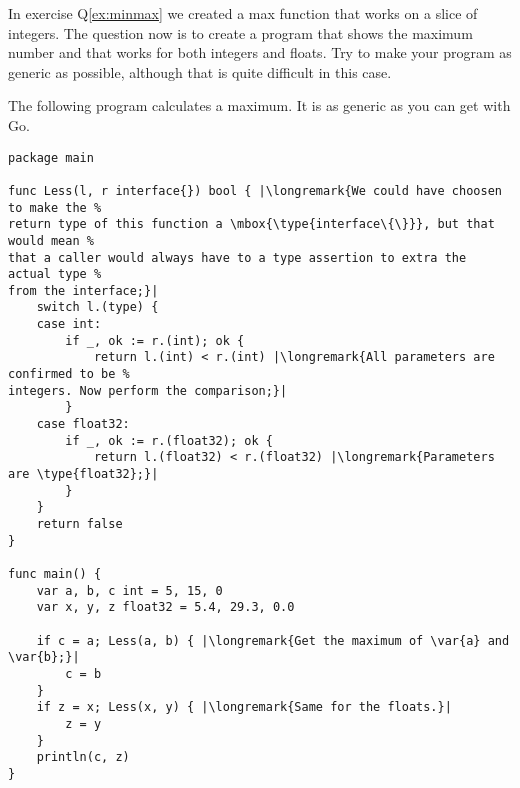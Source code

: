 \begin{Exercise}[title={Interfaces and max()},difficulty=7]
\Question
In exercise Q\ref{ex:minmax} we created a max function that works on
a slice of integers.
The question now is to create
a program that shows the maximum number and that works for both integers and floats.
Try to make your program as generic as possible, although that is quite difficult in
this case.
\end{Exercise}

\begin{Answer}
\Question
The following program calculates a maximum. It is as generic as you can get
with Go.

\begin{lstlisting}[caption=Generic way of calculating a maximum]
package main

func Less(l, r interface{}) bool { |\longremark{We could have choosen to make the %
return type of this function a \mbox{\type{interface\{\}}}, but that would mean %
that a caller would always have to a type assertion to extra the actual type %
from the interface;}|
	switch l.(type) {
	case int:
		if _, ok := r.(int); ok {
			return l.(int) < r.(int) |\longremark{All parameters are confirmed to be %
integers. Now perform the comparison;}|
		}
	case float32:
		if _, ok := r.(float32); ok {
			return l.(float32) < r.(float32) |\longremark{Parameters are \type{float32};}|
		}
	}
	return false
}

func main() {
	var a, b, c int = 5, 15, 0
	var x, y, z float32 = 5.4, 29.3, 0.0

	if c = a; Less(a, b) { |\longremark{Get the maximum of \var{a} and \var{b};}|
		c = b
	}
	if z = x; Less(x, y) { |\longremark{Same for the floats.}|
		z = y
	}
	println(c, z)
}
\end{lstlisting}
\showremarks
\end{Answer}
